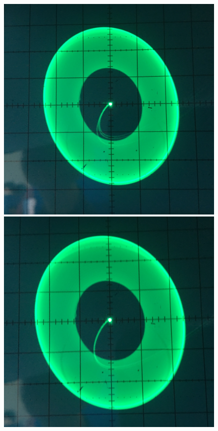 \begin{figure}[h]
	\centering
	\begin{minipage}{0.32\linewidth}
	\includegraphics[width=\linewidth]{photo/task1b(rights2).jpg}
	\end{minipage}
	\begin{minipage}{0.32\linewidth}
	\includegraphics[width=\linewidth]{photo/task1b(rights).jpg}

\end{minipage}
\end{figure}
